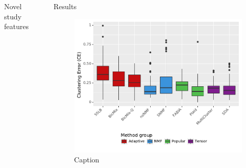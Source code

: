 \documentclass[xcolor=table,final]{beamer}
\newlength{\sepwid}
\newlength{\onecolwid}
\begin{document}
\begin{frame}[t]
\begin{columns}[t]
\begin{column}{\onecolwid}
\begin{block}{Novel study features}
\end{block}





\end{column} %

\begin{column}{\sepwid}\end{column} %

\begin{column}{\onecolwid} %


\begin{block}{Results}

\begin{figure}
\includegraphics[width=0.9 \textwidth]{plots/summary_clust_err_best_theoretical_K_init.pdf}
\caption{Caption}
\end{figure}


\end{block}
\end{column}
\end{columns}
\end{frame}
\end{document}
